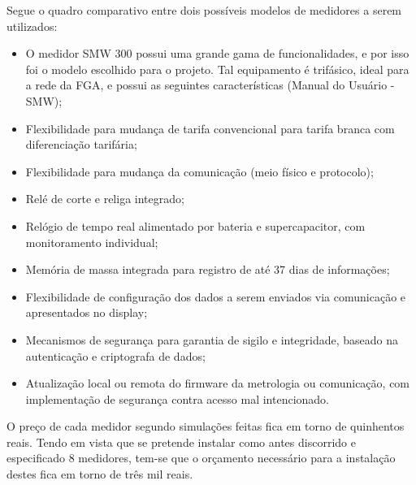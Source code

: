 Segue o quadro comparativo entre dois possíveis modelos de
medidores a serem utilizados:
\begin{itemize}
\item O medidor SMW 300 possui uma grande gama de funcionalidades, e por isso foi o
modelo escolhido para o projeto. Tal equipamento é trifásico, ideal para a rede da FGA, e possui as seguintes características (Manual do Usuário - SMW);
\item Flexibilidade para mudança de tarifa convencional para tarifa branca com diferenciação tarifária;
\item Flexibilidade para mudança da comunicação (meio físico e protocolo);
\item Relé de corte e religa integrado;
\item Relógio de tempo real alimentado por bateria e supercapacitor, com monitoramento individual;
\item Memória de massa integrada para registro de até 37 dias de informações;
\item Flexibilidade de configuração dos dados a serem enviados via comunicação e apresentados no display;
\item Mecanismos de segurança para garantia de sigilo e integridade, baseado na autenticação e criptografa de dados;
\item Atualização local ou remota do firmware da metrologia ou comunicação, com implementação de segurança contra acesso mal intencionado.
\end{itemize}

O preço de cada medidor segundo simulações feitas fica em torno de quinhentos reais. Tendo em vista que se pretende instalar como antes discorrido e especificado 8 medidores, tem-se que o orçamento necessário para a instalação destes fica em torno de três mil reais.









